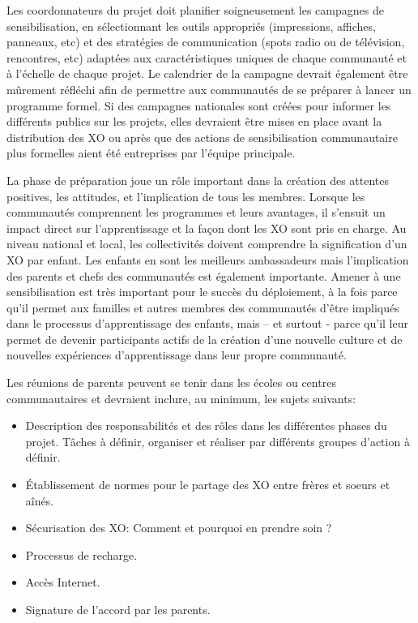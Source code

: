 \documentclass[12pt]{article}
\begin{document}
Les coordonnateurs du projet doit planifier soigneusement les campagnes de
sensibilisation, en sélectionnant les outils appropriés (impressions,
affiches, panneaux, etc) et des stratégies de communication (spots radio ou
de télévision, rencontres, etc) adaptées aux caractéristiques uniques de
chaque communauté et à l'échelle de chaque projet. Le calendrier de la
campagne devrait également être mûrement réfléchi afin de permettre aux
communautés de se préparer à lancer un programme formel. Si des campagnes
nationales sont créées pour informer les différents publics sur les
projets, elles devraient être mises en place avant la distribution des XO
ou après que des actions de sensibilisation communautaire plus formelles
aient été entreprises par l'équipe principale. 

La phase de préparation joue un rôle important dans la création des
attentes positives, les attitudes, et l'implication de tous les
membres. Lorsque les communautés comprennent les programmes et leurs
avantages, il s'ensuit un  impact direct sur l'apprentissage et la façon
dont les XO sont pris en charge. Au niveau national et local, les
collectivités doivent comprendre la signification d'un XO par enfant. Les
enfants en sont les meilleurs ambassadeurs mais l'implication des parents
et chefs des communautés est également importante. Amener à une
sensibilisation est très important pour le succès du déploiement, à la fois
parce qu'il permet aux familles et autres membres des communautés d'être
impliqués dans le processus d'apprentissage des enfants, mais – et
surtout - parce qu'il leur permet de devenir participants actifs de la
création d'une nouvelle culture et de nouvelles expériences d'apprentissage
dans leur propre communauté. 

Les réunions de parents peuvent se tenir dans les écoles ou  centres
communautaires et devraient inclure, au minimum, les sujets suivants:

\begin{itemize}
\item Description des responsabilités et des rôles dans les différentes phases
  du projet. Tâches à définir, organiser et réaliser par différents groupes
  d'action à définir.
\item Établissement de normes pour le partage des XO entre frères et soeurs et
  aînés.
\item Sécurisation des XO: Comment et pourquoi en prendre soin  ?
\item Processus de recharge.
\item Accès Internet.
\item Signature de l'accord par les parents.
\end{itemize}
\end{document}
